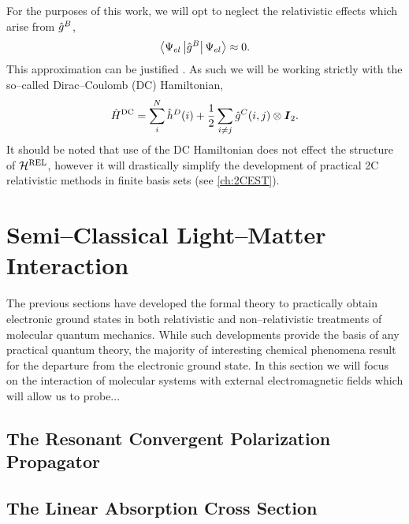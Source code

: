 For the purposes of this work, we will opt to neglect the relativistic effects which arise from $\hat{g}^B$,
\begin{equation}
  \left\langle \Psi_{el} \left\vert \hat{g}^B \right\vert \Psi_{el} \right\rangle \approx 0.
\end{equation}
This approximation can be justified . As such we will be working strictly with the so--called
Dirac--Coulomb (DC) Hamiltonian,
\begin{equation}
  \hat{H}^{\mathrm{DC}} = \sum_i^N  \hat{h}^D(i) + \frac{1}{2} \sum_{i \neq j}\hat{g}^C(i,j) \otimes \boldsymbol{I}_2. 
\end{equation}
It should be noted that use of the DC Hamiltonian does not effect the structure of $\mathcal{H}^{\mathrm{REL}}$,
however it will drastically simplify the development of practical 2C relativistic methods
in finite basis sets (see \cref{ch:2CEST}).













\section{Semi--Classical Light--Matter Interaction}
\label{sec:SCLMI}


The previous sections have developed the formal theory to practically obtain electronic ground states
in both relativistic and non--relativistic treatments of molecular quantum mechanics. While such
developments provide the basis of any practical quantum theory, the majority of interesting chemical
phenomena result for the departure from the electronic ground state. In this section we will
focus on the interaction of molecular systems with external electromagnetic fields which will
allow us to probe...

\subsection{The Resonant Convergent Polarization Propagator}
\label{sec:PolarProp}

\subsection{The Linear Absorption Cross Section}
\label{sec:AbsorptionTheory}
